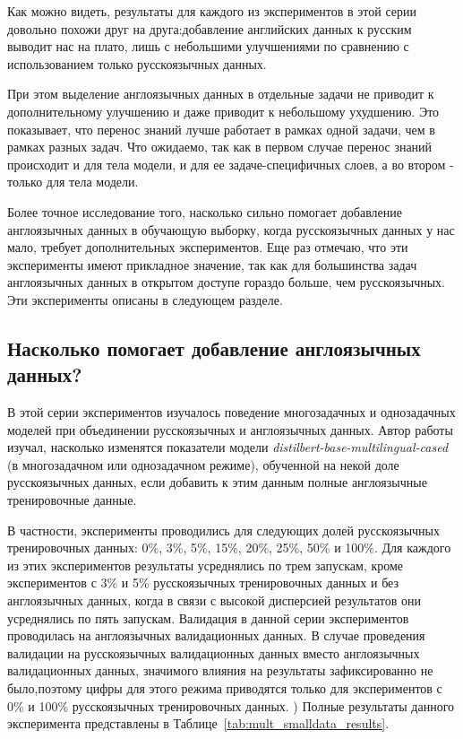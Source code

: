 Как можно видеть, результаты для каждого из экспериментов в этой серии довольно похожи друг на друга:добавление английских данных к русским выводит нас на плато, лишь с небольшими улучшениями по сравнению с использованием только русскоязычных данных.  

При этом выделение англоязычных данных в отдельные задачи не приводит к дополнительному улучшению и даже приводит к небольшому ухудшению. Это показывает, что перенос знаний лучше работает в рамках одной задачи, чем в рамках разных задач. Что ожидаемо, так как в первом случае перенос знаний происходит и для тела модели, и для ее задаче-специфичных слоев, а во втором - только для тела модели. 

Более точное исследование того, насколько сильно помогает добавление англоязычных данных в обучающую выборку, когда русскоязычных данных у нас мало, требует дополнительных экспериментов. Еще раз отмечаю, что эти эксперименты имеют прикладное значение, так как для большинства задач англоязычных данных в открытом доступе гораздо больше, чем русскоязычных. Эти эксперименты описаны в следующем разделе.

\subsection{Насколько помогает добавление англоязычных данных? }

В этой серии экспериментов изучалось поведение многозадачных и однозадачных моделей при объединении русскоязычных и англоязычных данных.  Автор работы изучал, насколько изменятся показатели модели \textit{distilbert-base-multilingual-cased} (в многозадачном или однозадачном режиме), обученной на некой доле русскоязычных данных, если добавить к этим данным полные англоязычные тренировочные данные.

В частности, эксперименты проводились для следующих долей русскоязычных тренировочных данных: 0\%, 3\%, 5\%, 15\%, 20\%, 25\%, 50\% и 100\%. Для каждого из этих экспериментов результаты усреднялись по трем запускам, кроме экспериментов с 3\% и 5\% русскоязычных тренировочных данных и без англоязычных данных, когда в связи с высокой дисперсией результатов они усреднялись по пять запускам. 
Валидация в данной серии экспериментов проводилась на англоязычных валидационных данных. В случае проведения валидации на русскоязычных валидационных данных вместо англоязычных валидационных данных, значимого влияния на результаты зафиксированно не было,поэтому цифры для этого режима приводятся только для экспериментов с 0\% и 100\% русскоязычных тренировочных данных. ) 
 Полные результаты данного эксперимента представлены в Таблице~\ref{tab:mult_smalldata_results}. 

